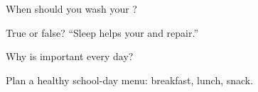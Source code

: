 \begin{exercise}[$\star$]\label{exo:g2:healthy:2}
When should you wash your ?
\end{exercise}

\begin{exercise}[$\star$]\label{exo:g2:healthy:3}
True or false? ``Sleep helps your   and repair.''
\end{exercise}

\begin{exercise}[$\star$]\label{exo:g2:healthy:4}
Why is  important every day?
\end{exercise}

\begin{exercise}[$\star\star$]\label{exo:g2:healthy:5}
Plan a healthy school-day menu: breakfast, lunch, snack.
\end{exercise}

